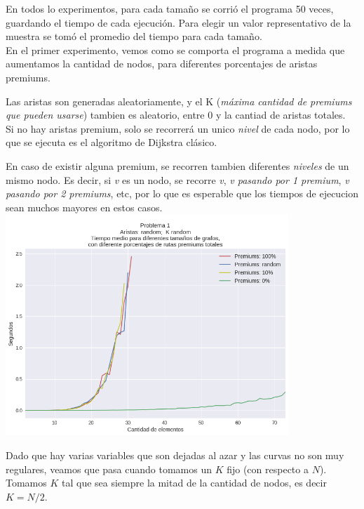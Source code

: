 En todos lo experimentos, para cada tamaño se corrió el programa 50 veces, guardando el tiempo de cada ejecución. Para elegir un valor representativo de la muestra se tomó el promedio del tiempo para cada tamaño. \\

En el primer experimento, vemos como se comporta el programa a medida que aumentamos la cantidad de nodos, para diferentes porcentajes de aristas premiums.

Las aristas son generadas aleatoriamente, y el K (\textit{máxima cantidad de premiums que pueden usarse}) tambien es aleatorio, entre 0 y la cantiad de aristas totales. \\

Si no hay aristas premium, solo se recorrerá un unico \textit{nivel} de cada nodo, por lo que se ejecuta es el algoritmo de Dijkstra clásico.

En caso de existir alguna premium, se recorren tambien diferentes \textit{niveles} de un mismo nodo. Es decir, si \textit{v} es un nodo, se recorre \textit{v}, \textit{v pasando por 1 premium}, \textit{v pasando por 2 premiums}, etc, por lo que es esperable que los tiempos de ejecucion sean muchos mayores en estos casos. \\

{\centering
  \includegraphics[width=0.8\textwidth]{imagenes/problema1/todo_random.png} \\
}

Dado que hay varias variables que son dejadas al azar y las curvas no son muy regulares, veamos que pasa cuando tomamos un $K$ fijo (con respecto a $N$). Tomamos $K$ tal que sea siempre la mitad de la cantidad de nodos, es decir $K = N/2$. \\

